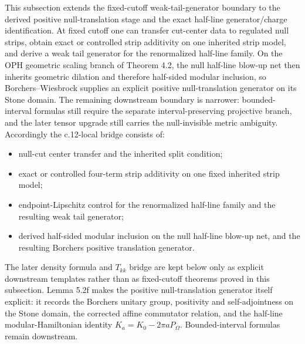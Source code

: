 This subsection extends the fixed-cutoff weak-tail-generator boundary to the derived positive null-translation stage and the exact half-line generator/charge identification. At fixed cutoff one can transfer cut-center data to regulated null strips, obtain exact or controlled strip additivity on one inherited strip model, and derive a weak tail generator for the renormalized half-line family. On the OPH geometric scaling branch of Theorem 4.2, the null half-line blow-up net then inherits geometric dilation and therefore half-sided modular inclusion, so Borchers--Wiesbrock supplies an explicit positive null-translation generator on its Stone domain. The remaining downstream boundary is narrower: bounded-interval formulas still require the separate interval-preserving projective branch, and the later tensor upgrade still carries the null-invisible metric ambiguity. Accordingly the c.12-local bridge consists of:
\begin{itemize}
\tightlist
\item
  null-cut center transfer and the inherited split condition;
\item
  exact or controlled four-term strip additivity on one fixed inherited strip model;
\item
  endpoint-Lipschitz control for the renormalized half-line family and the resulting weak tail generator;
\item
  derived half-sided modular inclusion on the null half-line blow-up net, and the resulting Borchers positive translation generator.
\end{itemize}
The later density formula and \(T_{kk}\) bridge are kept below only as explicit downstream templates rather than as fixed-cutoff theorems proved in this subsection. Lemma 5.2f makes the positive null-translation generator itself explicit: it records the Borchers unitary group, positivity and self-adjointness on the Stone domain, the corrected affine commutator relation, and the half-line modular-Hamiltonian identity \(K_a=K_0-2\pi aP_\Omega\). Bounded-interval formulas remain downstream.

